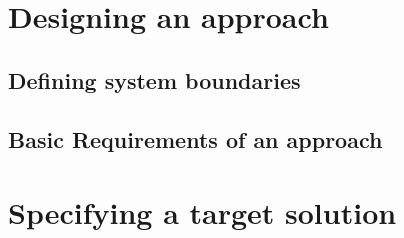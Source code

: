\chapter{Designing an approach}
\section{Defining system boundaries}
\section{Basic Requirements of an approach}

\chapter{Specifying a target solution}


